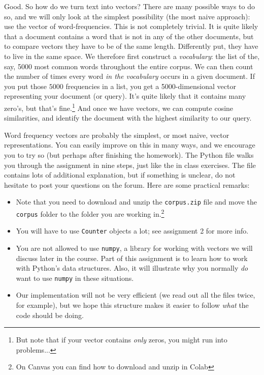 \documentclass[11pt, a4paper]{article}
\begin{document}
Good. 
So how do we turn text into vectors?
There are many possible ways to do so, and we will only look at the simplest possibility (the most naive approach): use the vector of word-frequencies.
This is not completely trivial.
It is quite likely that a document contains a word that is not in any of the other documents, but to compare vectors they have to be of the same length.
Differently put, they have to live in the same space.
We therefore first construct a \emph{vocabulary}: the list of the, say, 5000 most common words throughout the entire corpus.
We can then count the number of times every word \emph{in the vocabulary} occurs in a given document. 
If you put those $5000$ frequencies in a list, you get a 5000-dimensional vector representing your document (or query).
It's quite likely that it contains many zero's, but that's fine.\footnote{But note that if your vector contains \emph{only} zeros, you might run into problems...} 
And once we have vectors, we can compute cosine similarities, and identify the document with the highest similarity to our query.


Word frequency vectors are probably the simplest, or most naive, vector representations. 
You can easily improve on this in many ways, and we encourage you to try so (but perhaps after finishing the homework). 
The Python file walks you through the assignment in nine steps, just like the in class exercises. 
The file contains lots of additional explanation, but if something is unclear, do not hesitate to post your questions on the forum. Here are some practical remarks:

\begin{itemize}
  \item Note that you need to download and unzip the \texttt{corpus.zip} file and move the \texttt{corpus} folder to the folder you are working in.\footnote{On Canvas you can find how to download and unzip in Colab} 
  \item You will have to use \texttt{Counter} objects a lot; see assignment 2 for more info.
  \item You are not allowed to use \texttt{numpy}, a library for working with vectors we will discuss later in the course. Part of this assignment is to learn how to work with Python's data structures. Also, it will illustrate why you normally \emph{do} want to use \texttt{numpy} in these situations.
  \item Our implementation will not be very efficient (we read out all the files twice, for example), but we hope this structure makes it easier to follow \emph{what} the code should be doing. 
\end{itemize}
\end{document}
